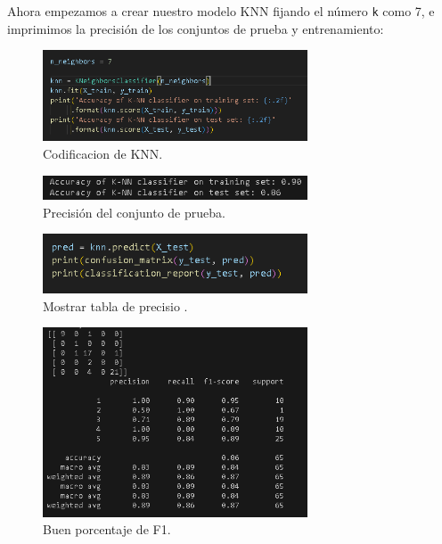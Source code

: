 \documentclass{article}
\begin{document}
Ahora empezamos a crear nuestro modelo KNN fijando el número \texttt{k} como 7, e imprimimos la precisión de los conjuntos de prueba y entrenamiento:

\begin{figure}[H]
    \centering
    \includegraphics[width=0.7\textwidth]{img/14.png}
    \caption{Codificacion de KNN.}
\end{figure}

\begin{figure}[H]
    \centering
    \includegraphics[width=0.7\textwidth]{img/15.png}
    \caption{Precisión del conjunto de prueba.}
\end{figure}

\begin{figure}[H]
    \centering
    \includegraphics[width=0.7\textwidth]{img/16.png}
    \caption{Mostrar tabla de precisio .}
\end{figure}

\begin{figure}[H]
    \centering
    \includegraphics[width=0.7\textwidth]{img/17.png}
    \caption{Buen porcentaje de F1.}
\end{figure}
\end{document}

